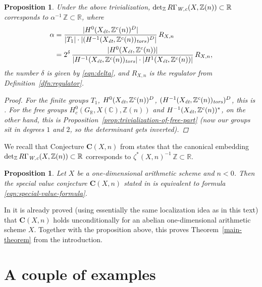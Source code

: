 \documentclass{article}
\newcommand{\CC}{\mathbb{C}}
\newcommand{\RR}{\mathbb{R}}
\newcommand{\ZZ}{\mathbb{Z}}
\renewcommand{\det}{\operatorname{det}}
\newcommand{\et}{\text{\it \'{e}t}}
\newcommand{\tors}{\text{\it tors}}
\newcommand{\Wc}{\text{\it W,c}}
\theoremstyle{myplain}
\newtheorem{proposition}[theorem]{Proposition}
\theoremstyle{mydefinition}
\begin{document}
\begin{proposition}
  Under the above trivialization, $\det_\ZZ R\Gamma_\Wc (X, \ZZ(n)) \subset \RR$
  corresponds to $\alpha^{-1}\,\ZZ \subset \RR$, where
  \begin{align*}
    \alpha & = \frac{|H^0 (X_\et, \ZZ^c(n))^D|}{|T_1| \cdot |(H^{-1} (X_\et, \ZZ^c(n))_\tors)^D|}\,R_{X,n} \\
           & = 2^\delta\,\frac{|H^0 (X_\et, \ZZ^c (n))|}{|H^{-1} (X_\et, \ZZ^c(n))_\tors|\cdot |H^1 (X_\et, \ZZ^c(n))|}\,R_{X,n},
  \end{align*}
  the number $\delta$ is given by \eqref{eqn:delta}, and $R_{X,n}$ is
  the regulator from Definition~\ref{dfn:regulator}.

  \begin{proof}
    For the finite groups $T_1$, $H^0 (X_\et, \ZZ^c(n))^D$,
    $(H^{-1} (X_\et, \ZZ^c(n))_\tors)^D$, this is
    \cite[Lemma~A.5]{Beshenov-Weil-etale-2}. For the free groups
    $H^0_c (G_\RR, X(\CC), \ZZ(n))$ and $H^{-1} (X_\et, \ZZ^c (n))^*$, on the
    other hand, this is Proposition~\ref{prop:trivialization-of-free-part}
    (now our groups sit in degrees $1$ and $2$, so the determinant gets
    inverted).
  \end{proof}
\end{proposition}

We recall that Conjecture $\mathbf{C} (X,n)$ from
\cite[\S 4]{Beshenov-Weil-etale-2} states that the canonical embedding
$\det_\ZZ R\Gamma_\Wc (X, \ZZ(n)) \subset \RR$ corresponds to
$\zeta^* (X,n)^{-1}\,\ZZ \subset \RR$.

\begin{proposition}
  Let $X$ be a one-dimensional arithmetic scheme and ${n < 0}$. Then the special
  value conjecture $\mathbf{C} (X,n)$ stated in \cite{Beshenov-Weil-etale-2} is
  equivalent to formula \eqref{eqn:special-value-formula}.
\end{proposition}

In \cite[\S 7]{Beshenov-Weil-etale-2} it is already proved (using essentially
the same localization idea as in this text) that $\mathbf{C} (X,n)$ holds
unconditionally for an abelian one-dimensional arithmetic scheme $X$. Together
with the proposition above, this proves Theorem~\ref{main-theorem} from the
introduction.


\section{A couple of examples}
\label{sec:examples}
\end{document}
